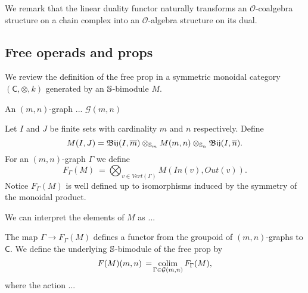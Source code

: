 We remark that the linear duality functor naturally transforms an $\mathcal O$-coalgebra structure on a chain complex into an $\mathcal O$-algebra structure on its dual.


\subsection{Free operads and props}

We review the definition of the free prop in a symmetric monoidal category $(\mathsf C, \otimes, k)$ generated by an $\S$-bimodule $M$.

An $(m, n)$-graph ... $\mathcal G(m, n)$

Let $I$ and $J$ be finite sets with cardinality $m$ and $n$ respectively.
Define
\begin{equation*}
M(I, J) = \Bij(I, \overline m) \otimes_{\S_m} M(m, n) \otimes_{\S_n} \Bij(I, \overline n).
\end{equation*}
For an $(m, n)$-graph $\Gamma$ we define
\begin{equation*}
F_\Gamma(M)\ =\!\!\! \bigotimes_{v \in Vert(\Gamma)}M(In(v), Out(v)).
\end{equation*}
Notice $F_\Gamma(M)$ is well defined up to isomorphisms induced by the symmetry of the monoidal product.

We can interpret the elements of $M$ as ...

The map $\Gamma \to F_\Gamma(M)$ defines a functor from the groupoid of $(m,n)$-graphs to $\mathsf C$. We define the underlying $\S$-bimodule of the free prop by
\begin{equation*}
F(M)(m, n)\, =\! \colim_{\Gamma \in \mathcal G(m, n)} F_\Gamma(M),
\end{equation*}
where the action ...

